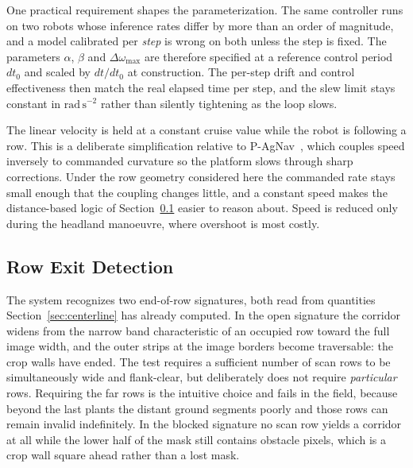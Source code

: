 \documentclass[conference]{IEEEtran}
\begin{document}
One practical requirement shapes the parameterization. The same controller runs
on two robots whose inference rates differ by more than an order of magnitude,
and a model calibrated per \emph{step} is wrong on both unless the step is
fixed. The parameters $\alpha$, $\beta$ and $\Delta\omega_{\max}$ are therefore
specified at a reference control period $dt_0$ and scaled by $dt/dt_0$ at
construction. The per-step drift and control effectiveness then match the real
elapsed time per step, and the slew limit stays constant in
$\mathrm{rad}\,\mathrm{s}^{-2}$ rather than silently tightening as the loop
slows.

The linear velocity is held at a constant cruise value while the robot is
following a row. This is a deliberate simplification relative to
P-AgNav~\cite{kim2025pagnav}, which couples speed inversely to commanded
curvature so the platform slows through sharp corrections. Under the row
geometry considered here the commanded rate stays small enough that the coupling
changes little, and a constant speed makes the distance-based logic of
Section~\ref{sec:exit} easier to reason about. Speed is reduced only during the
headland manoeuvre, where overshoot is most costly.

\subsection{Row Exit Detection}
\label{sec:exit}
The system recognizes two end-of-row signatures, both read from quantities
Section~\ref{sec:centerline} has already computed. In the open signature the
corridor widens from the narrow band characteristic of an occupied row toward
the full image width, and the outer strips at the image borders become
traversable: the crop walls have ended. The test requires a sufficient number of
scan rows to be simultaneously wide and flank-clear, but deliberately does not
require \emph{particular} rows. Requiring the far rows is the intuitive choice
and fails in the field, because beyond the last plants the distant ground
segments poorly and those rows can remain invalid indefinitely. In the blocked
signature no scan row yields a corridor at all while the lower half of the mask
still contains obstacle pixels, which is a crop wall square ahead rather than a
lost mask.
\end{document}
